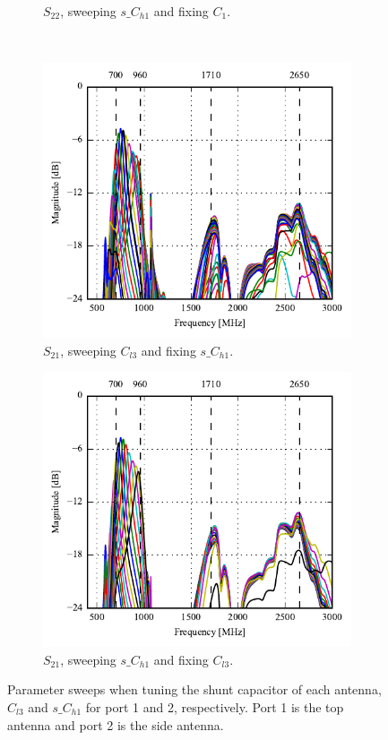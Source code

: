\begin{figure}[htbp]
\begin{subfigure}{0.49\linewidth}
        \caption{$S_{22}$, sweeping $s\_C_{h1}$ and fixing $C_1$.}
    \end{subfigure}
    \\
    \begin{subfigure}{0.49\linewidth}
        \centering
        \includegraphics{img/tech_sol/nonresonant/simulation/freespace/s12_top_sweep.pdf}
        \caption{$S_{21}$, sweeping $C_{l3}$ and fixing $s\_C_{h1}$.}
    \end{subfigure}
    \hfill
    \begin{subfigure}{0.49\linewidth}
        \centering
        \includegraphics{img/tech_sol/nonresonant/simulation/freespace/s21_side_sweep.pdf}
        \caption{$S_{21}$, sweeping $s\_C_{h1}$ and fixing $C_{l3}$.}
    \end{subfigure}
    \caption{Parameter sweeps when tuning the shunt capacitor of each antenna, $C_{l3}$ and $s\_C_{h1}$ for port 1 and 2, respectively. Port 1 is the top antenna and port 2 is the side antenna.}
    \label{fig:ant3sweeps}
\end{figure}

